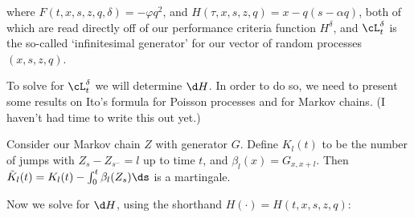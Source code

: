 \documentclass[12pt]{article}
\begin{document}
where $F(t,x,s,z,q,\delta) = -\varphi q^2$, and $H(\tau,x,s,z,q) = x - q(s-\alpha q)$, both of which are read directly off of our performance criteria function $H^\delta$, and $\cL^{\delta}_t$ is the so-called `infinitesimal generator' for our vector of random processes $(x,s,z,q)$. 

To solve for $\cL^{\delta}_t$ we will determine $\d H$. In order to do so, we need to present some results on Ito's formula for Poisson processes and for Markov chains. (I haven't had time to write this out yet.) 

Consider our Markov chain $Z$ with generator $G$. Define $K_l(t)$ to be the number of jumps with $Z_s - Z_{s^-} = l$ up to time $t$, and $\beta_l(x) = G_{x,x+l}$. Then $\tilde{K}_l(t) = K_l(t) - \int_0^t \beta_l(Z_s)\ds$ is a martingale. 

Now we solve for $\d H$, using the shorthand $H(\cdot) = H(t,x,s,z,q)$:
\end{document}
